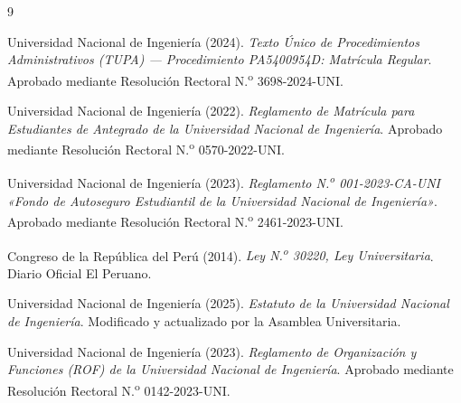 \begin{thebibliography}{9}

Universidad Nacional de Ingeniería (2024). \textit{Texto Único de Procedimientos Administrativos (TUPA) --- Procedimiento PA5400954D: Matrícula Regular}. Aprobado mediante Resolución Rectoral N.\textsuperscript{o} 3698-2024-UNI.

Universidad Nacional de Ingeniería (2022). \textit{Reglamento de Matrícula para Estudiantes de Antegrado de la Universidad Nacional de Ingeniería}. Aprobado mediante Resolución Rectoral N.\textsuperscript{o} 0570-2022-UNI.

Universidad Nacional de Ingeniería (2023). \textit{Reglamento N.\textsuperscript{o} 001-2023-CA-UNI «Fondo de Autoseguro Estudiantil de la Universidad Nacional de Ingeniería»}. Aprobado mediante Resolución Rectoral N.\textsuperscript{o} 2461-2023-UNI.

Congreso de la República del Perú (2014). \textit{Ley N.\textsuperscript{o} 30220, Ley Universitaria}. Diario Oficial El Peruano.

Universidad Nacional de Ingeniería (2025). \textit{Estatuto de la Universidad Nacional de Ingeniería}. Modificado y actualizado por la Asamblea Universitaria.

Universidad Nacional de Ingeniería (2023). \textit{Reglamento de Organización y Funciones (ROF) de la Universidad Nacional de Ingeniería}. Aprobado mediante Resolución Rectoral N.\textsuperscript{o} 0142-2023-UNI.

\end{thebibliography}
